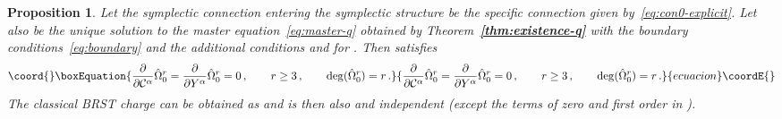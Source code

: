 \documentclass[a4paper,11pt]{amsart}
\newtheorem{prop}[thm]{Proposition}
\numberwithin{thm}{section} %
\numberwithin{equation}{section} %
\numberwithin{figure}{section} %
\providecommand{\bref}[1]{{\bf \ref{#1}}}
\renewcommand{\deg}[1]{{\rm deg}(#1)}
\renewcommand{\:}{{\rm\, :\,}}
\def\bar{\overline}
\def\d{\partial}
\providecommand{\dl}[1]{\displaystyle\frac{{\d}}{\d #1}}
\def\cc{{\mathcal C}}
\def\con{{\bar\Gamma}}
\begin{document}
\begin{prop}\label{prop:Omega-special}
Let the symplectic connection entering the symplectic structure
be the specific connection \myHighlight{$\con^0$}\coordHE{} given by~\eqref{eq:con0-explicit}.
Let also \coordHE{} be the unique solution to the master
equation~\eqref{eq:master-q} obtained by
Theorem~\bref{thm:existence-q} with the boundary
conditions~\eqref{eq:boundary} and the additional conditions
\coordHE{} and
\myHighlight{${\hat\Omega}_0^r={\hat\Omega}_0^r(x,Y,\cc,\hbar)$}\coordHE{} for \coordHE{}.
Then \coordHE{} satisfies
\begin{equation}\coord{}\boxEquation{
\label{eq:property}
  \dl{\cc^\alpha}{\hat\Omega}_0^r=\dl{Y^\alpha}{\hat\Omega}_0^r=0\,,
\qquad r \geq 3\,, \qquad \deg{{\hat\Omega}^r_0}=r\,.
}{
\dl{\cc^\alpha}{\hat\Omega}_0^r=\dl{Y^\alpha}{\hat\Omega}_0^r=0\,,
\qquad r \geq 3\,, \qquad \deg{{\hat\Omega}^r_0}=r\,.
}{ecuacion}\coordE{}\end{equation}
The classical BRST charge \coordHE{} can be obtained as
\coordHE{} and is then also
\coordHE{} and \myHighlight{$\cc^\alpha$}\coordHE{} independent (except the terms of zero and
first order in \coordHE{}).
\end{prop}
\end{document}
